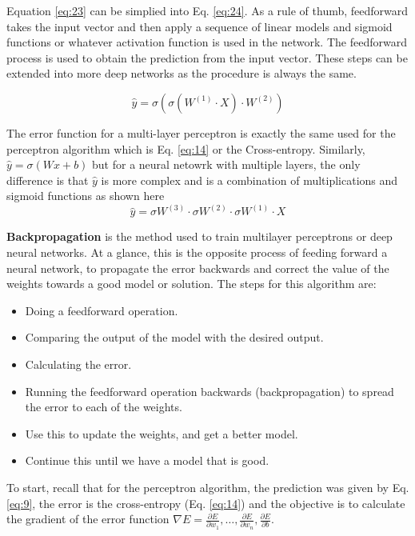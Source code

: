 \documentclass{article}
\begin{document}
Equation \eqref{eq:23} can be simplied into Eq. \eqref{eq:24}. As a rule of thumb, feedforward takes the input vector and then apply a sequence of linear models and sigmoid functions or whatever activation function is used in the network. The feedforward process is used to obtain the prediction from the input vector. These steps can be extended into more deep networks as the procedure is always the same.

\begin{equation}
\label{eq:24}
\hat{y} = \sigma(\sigma(W^{(1)} \cdot X) \cdot W^{(2)})
\end{equation}

The error function for a multi-layer perceptron is exactly the same used for the perceptron algorithm which is Eq. \eqref{eq:14} or the Cross-entropy. Similarly, \(\hat{y} = \sigma(Wx + b)\) but for a neural netowrk with multiple layers, the only difference is that \(\hat{y}\) is more complex and is a combination of multiplications and sigmoid functions as shown here \[\hat{y} = \sigma W^{(3)} \cdot \sigma W^{(2)} \cdot \sigma W^{(1)} \cdot X \]

\textbf{Backpropagation} is the method used to train multilayer perceptrons or deep neural networks. At a glance, this is the opposite process of feeding forward a neural network, to propagate the error backwards and correct the value of the weights towards a good model or solution. The steps for this algorithm are:

\begin{itemize}
  \item Doing a feedforward operation.
  \item Comparing the output of the model with the desired output.
  \item Calculating the error.
  \item Running the feedforward operation backwards (backpropagation) to spread the error to each of the weights.
  \item Use this to update the weights, and get a better model.
  \item Continue this until we have a model that is good.
\end{itemize}

To start, recall that for the perceptron algorithm, the prediction was given by Eq. \eqref{eq:9}, the error is the cross-entropy (Eq. \eqref{eq:14}) and the objective is to calculate the gradient of the error function \(\nabla E = \frac{\partial E}{\partial w_1}, \dots, \frac{\partial E}{\partial w_n}, \frac{\partial E}{\partial b}\).
    
\end{document}
